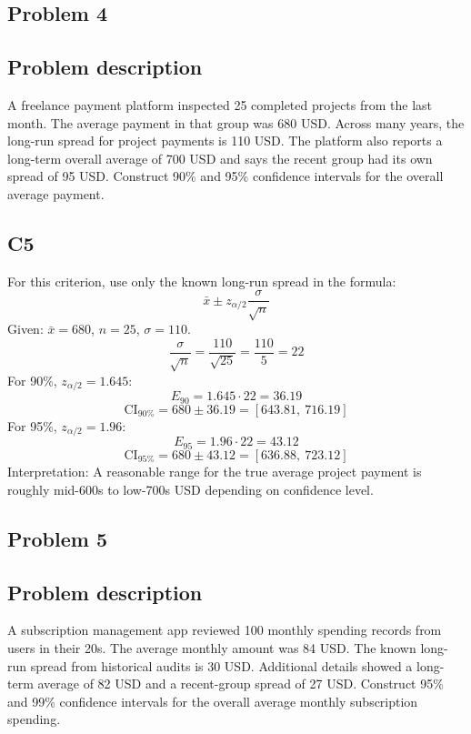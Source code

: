 \begin{ExamProblems}
		\newpage
		\item
		\subsection*{Problem 4}
		\subsection*{Problem description}
		A freelance payment platform inspected 25 completed projects from the last month.
		The average payment in that group was 680 USD.
		Across many years, the long-run spread for project payments is 110 USD.
		The platform also reports a long-term overall average of 700 USD and says the recent group had its own spread of 95 USD.
		Construct 90\% and 95\% confidence intervals for the overall average payment.

		\subsection*{C5}
		For this criterion, use only the known long-run spread in the formula:
		\[
		\bar{x} \pm z_{\alpha/2}\frac{\sigma}{\sqrt{n}}
		\]
		Given: $\bar{x}=680$, $n=25$, $\sigma=110$.
		\[
		\frac{\sigma}{\sqrt{n}}=\frac{110}{\sqrt{25}}=\frac{110}{5}=22
		\]
		For 90\%, $z_{\alpha/2}=1.645$:
		\[
		E_{90}=1.645\cdot 22=36.19
		\]
		\[
		\text{CI}_{90\%}=680\pm 36.19=[643.81,\ 716.19]
		\]
		For 95\%, $z_{\alpha/2}=1.96$:
		\[
		E_{95}=1.96\cdot 22=43.12
		\]
		\[
		\text{CI}_{95\%}=680\pm 43.12=[636.88,\ 723.12]
		\]
		Interpretation: A reasonable range for the true average project payment is roughly mid-600s to low-700s USD depending on confidence level.

		\newpage
		\item
		\subsection*{Problem 5}
		\subsection*{Problem description}
		A subscription management app reviewed 100 monthly spending records from users in their 20s.
		The average monthly amount was 84 USD.
		The known long-run spread from historical audits is 30 USD.
		Additional details showed a long-term average of 82 USD and a recent-group spread of 27 USD.
		Construct 95\% and 99\% confidence intervals for the overall average monthly subscription spending.


\end{ExamProblems}
